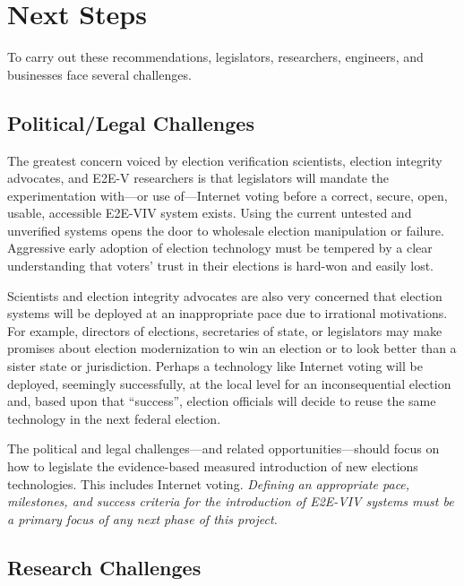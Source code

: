 \section{Next Steps}
\label{sec:next-steps}

To carry out these recommendations, legislators, researchers,
engineers, and businesses face several challenges.

\subsection{Political/Legal Challenges}

The greatest concern voiced by election verification scientists,
election integrity advocates, and E2E-V researchers is that
legislators will mandate the experimentation with---or use
of---Internet voting before a correct, secure, open, usable,
accessible E2E-VIV system exists. Using the current untested and
unverified systems opens the door to wholesale election manipulation
or failure. Aggressive early adoption of election technology must be
tempered by a clear understanding that voters' trust in their
elections is hard-won and easily lost.

Scientists and election integrity advocates are also very concerned
that election systems will be deployed at an inappropriate pace due to
irrational motivations. For example, directors of elections,
secretaries of state, or legislators may make promises about election
modernization to win an election or to look better than a sister state
or jurisdiction. Perhaps a technology like Internet voting will be
deployed, seemingly successfully, at the local level for an
inconsequential election and, based upon that ``success'', election
officials will decide to reuse the same technology in the next federal
election.

The political and legal challenges---and related
opportunities---should focus on how to legislate the evidence-based
measured introduction of new elections technologies. This includes
Internet voting. \emph{Defining an appropriate pace, milestones, and
  success criteria for the introduction of E2E-VIV systems must be a
  primary focus of any next phase of this project.}

\subsection{Research Challenges}

